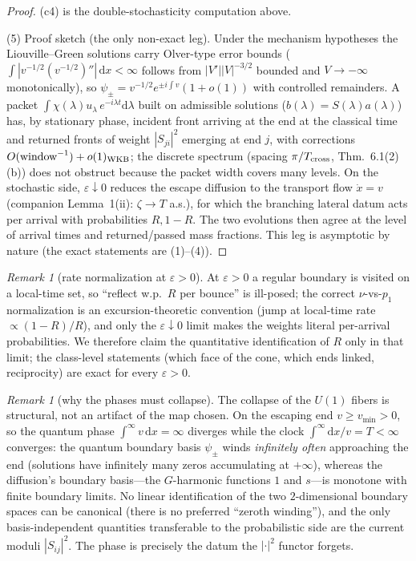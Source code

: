 \documentclass[11pt]{article}
\theoremstyle{remark}
\newtheorem{remark}[theorem]{Remark}
\newcommand{\dd}{\mathrm{d}}
\newcommand{\lam}{\lambda}
\begin{document}
\begin{proof}
(c4) is the double-stochasticity computation above.

(5) Proof sketch (the only non-exact leg).  Under the mechanism
hypotheses the Liouville--Green solutions carry Olver-type error bounds
($\int|v^{-1/2}(v^{-1/2})''|\,\dd x<\infty$ follows from
$|V'||V|^{-3/2}$ bounded and $V\to-\infty$ monotonically), so
$\psi_\pm=v^{-1/2}e^{\pm i\int v}(1+o(1))$ with controlled remainders.
A packet $\int\chi(\lam)u_\lam\,e^{-i\lam t}\dd\lam$ built on admissible
solutions ($b(\lam)=S(\lam)a(\lam)$) has, by stationary phase, incident
front arriving at the end at the classical time and returned fronts of
weight $|S_{ji}|^2$ emerging at end $j$, with corrections
$O(\text{window}^{-1})+o(1)_{\rm WKB}$; the discrete spectrum
(spacing $\pi/T_{\rm cross}$, Thm.~6.1(2)(b)) does not obstruct because
the packet width covers many levels.  On the stochastic side,
$\varepsilon\downarrow0$ reduces the escape diffusion to the transport
flow $\dot x=v$ (companion Lemma~1(ii): $\zeta\to T$ a.s.), for which
the branching lateral datum acts per arrival with probabilities
$R,1-R$.  The two evolutions then agree at the level of arrival times
and returned/passed mass fractions.  This leg is asymptotic by nature
(the exact statements are (1)--(4)).
\end{proof}

\begin{remark}[rate normalization at $\varepsilon>0$]\label{rem:rate}
At $\varepsilon>0$ a regular boundary is visited on a local-time set,
so ``reflect w.p.\ $R$ per bounce'' is ill-posed; the correct $\nu$-vs-$p_1$
normalization is an excursion-theoretic convention (jump at local-time
rate $\propto(1-R)/R$), and only the $\varepsilon\downarrow0$ limit
makes the weights literal per-arrival probabilities.  We therefore
claim the quantitative identification of $R$ only in that limit; the
class-level statements (which face of the cone, which ends linked,
reciprocity) are exact for every $\varepsilon>0$.
\end{remark}

\begin{remark}[why the phases must collapse]\label{rem:winding}
The collapse of the $U(1)$ fibers is structural, not an artifact of the
map chosen.  On the escaping end $v\ge v_{\min}>0$, so the quantum
phase $\int^\infty v\,\dd x=\infty$ diverges while the clock
$\int^\infty\dd x/v=T<\infty$ converges: the quantum boundary basis
$\psi_\pm$ winds \emph{infinitely often} approaching the end (solutions
have infinitely many zeros accumulating at $+\infty$), whereas the
diffusion's boundary basis---the $G$-harmonic functions $1$ and
$s$---is monotone with finite boundary limits.  No linear
identification of the two $2$-dimensional boundary spaces can be
canonical (there is no preferred ``zeroth winding''), and the only
basis-independent quantities transferable to the probabilistic side are
the current moduli $|S_{ij}|^2$.  The phase is precisely the datum the
$|\cdot|^2$ functor forgets.
\end{remark}
\end{document}
